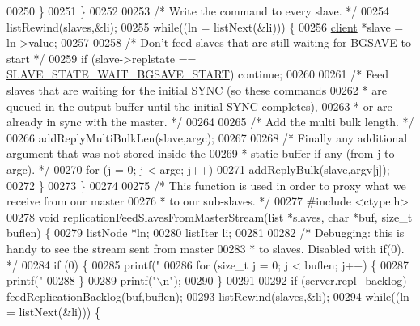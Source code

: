 \begin{DoxyCode}
{{{00250         \}
00251     \}
00252 
00253     \textcolor{comment}{/* Write the command to every slave. */}
00254     listRewind(slaves,&li);
00255     \textcolor{keywordflow}{while}((ln = listNext(&li))) \{
00256         \hyperlink{structclient}{client} *slave = ln->value;
00257 
00258         \textcolor{comment}{/* Don't feed slaves that are still waiting for BGSAVE to start */}
00259         \textcolor{keywordflow}{if} (slave->replstate == \hyperlink{server_8h_a170ee2dd8cfefaf0d112edcc3152f8d7}{SLAVE\_STATE\_WAIT\_BGSAVE\_START}) \textcolor{keywordflow}{continue};
00260 
00261         \textcolor{comment}{/* Feed slaves that are waiting for the initial SYNC (so these commands}
00262 \textcolor{comment}{         * are queued in the output buffer until the initial SYNC completes),}
00263 \textcolor{comment}{         * or are already in sync with the master. */}
00264 
00265         \textcolor{comment}{/* Add the multi bulk length. */}
00266         addReplyMultiBulkLen(slave,argc);
00267 
00268         \textcolor{comment}{/* Finally any additional argument that was not stored inside the}
00269 \textcolor{comment}{         * static buffer if any (from j to argc). */}
00270         \textcolor{keywordflow}{for} (j = 0; j < argc; j++)
00271             addReplyBulk(slave,argv[j]);
00272     \}
00273 \}
00274 
00275 \textcolor{comment}{/* This function is used in order to proxy what we receive from our master}
00276 \textcolor{comment}{ * to our sub-slaves. */}
00277 \textcolor{preprocessor}{#}\textcolor{preprocessor}{include} \textcolor{preprocessor}{<}\textcolor{preprocessor}{ctype}\textcolor{preprocessor}{.}\textcolor{preprocessor}{h}\textcolor{preprocessor}{>}
00278 \textcolor{keywordtype}{void} replicationFeedSlavesFromMasterStream(list *slaves, \textcolor{keywordtype}{char} *buf, size\_t buflen) \{
00279     listNode *ln;
00280     listIter li;
00281 
00282     \textcolor{comment}{/* Debugging: this is handy to see the stream sent from master}
00283 \textcolor{comment}{     * to slaves. Disabled with if(0). */}
00284     \textcolor{keywordflow}{if} (0) \{
00285         printf(\textcolor{stringliteral}{"%
00286         \textcolor{keywordflow}{for} (size\_t j = 0; j < buflen; j++) \{
00287             printf(\textcolor{stringliteral}{"%
00288         \}
00289         printf(\textcolor{stringliteral}{"\(\backslash\)n"});
00290     \}
00291 
00292     \textcolor{keywordflow}{if} (server.repl\_backlog) feedReplicationBacklog(buf,buflen);
00293     listRewind(slaves,&li);
00294     \textcolor{keywordflow}{while}((ln = listNext(&li))) \{
}}}}}
\end{DoxyCode}
